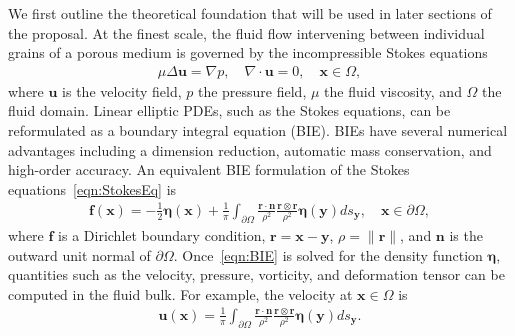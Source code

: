 \documentclass[11pt]{article}
\newcommand{\bvec}[1]{{\mathbf{#1}}}
\newcommand{\grad}{\nabla}
\newcommand{\uu}{\bvec{u}}
\newcommand{\xx}{\bvec{x}}
\newcommand{\nn}{{\mathbf{n}}}
\newcommand{\bd}{\partial}
\newcommand{\eeta}{\boldsymbol{\eta}}
\newcommand{\rr}{\mathbf{r}}
\newcommand{\ff}{\mathbf{f}}
\newcommand{\yy}{\mathbf{y}}
\begin{document}
We first outline the theoretical foundation that will be used in later sections of the proposal. At the finest scale, the fluid flow intervening between individual grains of a porous medium is governed by the incompressible Stokes equations
\begin{align}
  \label{eqn:StokesEq}
  \mu \Delta \uu = \grad p, \quad
  \grad \cdot \uu = 0, \quad \xx \in \Omega,
\end{align}
where $\uu$ is the velocity field, $p$ the pressure field, $\mu$ the fluid viscosity, and $\Omega$ the fluid domain. Linear elliptic PDEs, such as the Stokes equations, can be reformulated as a boundary integral equation (BIE).  BIEs have several numerical advantages including a dimension reduction, automatic mass conservation, and high-order accuracy. An equivalent BIE formulation of the Stokes equations~\eqref{eqn:StokesEq} is
\begin{align}
  \label{eqn:BIE}
  \ff(\xx) = -\frac{1}{2}\eeta(\xx) + \frac{1}{\pi} \int_{\bd\Omega}
    \frac{\rr \cdot \nn}{\rho^2} \frac{\rr \otimes \rr}{\rho^2}
    \eeta(\yy) ds_\yy, \quad \xx \in \bd\Omega,
\end{align}
where $\ff$ is a Dirichlet boundary condition, $\rr = \xx - \yy$, $\rho = \|\rr\|$, and $\nn$ is the outward unit normal of $\bd\Omega$.  Once~\eqref{eqn:BIE} is solved for the density function $\eeta$, quantities such as the velocity, pressure, vorticity, and deformation tensor can be computed in the fluid bulk.  For example, the velocity at $\xx \in \Omega$ is 
\begin{align}
  \uu(\xx) = \frac{1}{\pi} \int_{\bd\Omega}
    \frac{\rr \cdot \nn}{\rho^2} \frac{\rr \otimes \rr}{\rho^2}
    \eeta(\yy) ds_\yy.
\end{align}
\end{document}
